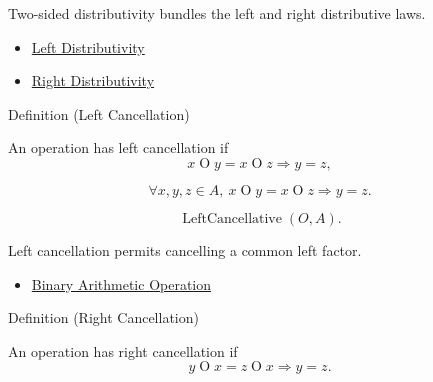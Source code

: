 \begin{remark*}[Interpretation]
Two-sided distributivity bundles the left and right distributive laws.
\end{remark*}

\begin{dependencies}
\begin{itemize}
  \item \hyperref[def:left-distributivity]{Left Distributivity}
  \item \hyperref[def:right-distributivity]{Right Distributivity}
\end{itemize}
\end{dependencies}

\begin{definitionbox}{Definition (Left Cancellation)}
\begin{definition}
\label{def:left-cancellation}
An operation has left cancellation if
\[
x\mathbin{O}y=x\mathbin{O}z \Longrightarrow y=z,
\]
\end{definition}
\end{definitionbox}

\begin{remark*}
\[
\forall x,y,z\in A,\ x\mathbin{O}y=x\mathbin{O}z \Longrightarrow y=z.
\]
\end{remark*}

\begin{remark*}
\[
\operatorname{LeftCancellative}(O,A).
\]
\end{remark*}

\begin{remark*}[Interpretation]
Left cancellation permits cancelling a common left factor.
\end{remark*}

\begin{dependencies}
\begin{itemize}
  \item \hyperref[def:binary-arithmetic-operation]{Binary Arithmetic Operation}
\end{itemize}
\end{dependencies}

\begin{definitionbox}{Definition (Right Cancellation)}
\begin{definition}
\label{def:right-cancellation}
An operation has right cancellation if
\[
y\mathbin{O}x=z\mathbin{O}x \Longrightarrow y=z.
\]
\end{definition}
\end{definitionbox}

